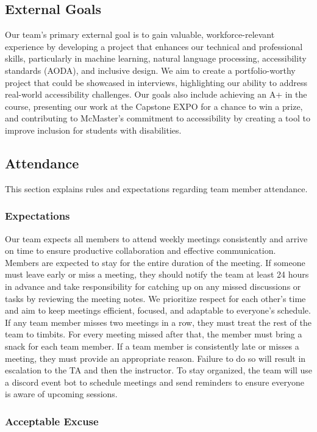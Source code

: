 \documentclass{article}
\begin{document}
\subsection*{External Goals}

Our team’s primary external goal is to gain valuable, workforce-relevant experience by 
developing a project that enhances our technical and professional skills, particularly 
in machine learning, natural language processing, accessibility standards (AODA), and inclusive design. We aim
to create a portfolio-worthy project that could be showcased in interviews, 
highlighting our ability to address real-world accessibility challenges. Our goals also 
include achieving an A+ in the course, presenting our work at the Capstone EXPO for a chance 
to win a prize, and contributing to McMaster's commitment to accessibility by creating a tool to 
improve inclusion for students with disabilities.  

\subsection*{Attendance}
This section explains rules and expectations regarding team member attendance.

\subsubsection*{Expectations}

Our team expects all members to attend weekly meetings consistently and arrive 
on time to ensure productive collaboration and effective communication. Members 
are expected to stay for the entire duration of the meeting. If someone must 
leave early or miss a meeting, they should notify the team at least 24 hours 
in advance and take responsibility for catching up on any missed discussions 
or tasks by reviewing the meeting notes. We prioritize respect for each other’s time and aim to keep meetings efficient, 
focused, and adaptable to everyone’s schedule. If any team member misses two 
meetings in a row, they must treat the rest of the team to timbits. For every 
meeting missed after that, the member must bring a snack for each team member.
If a team member is consistently late or misses a meeting, they must provide an 
appropriate reason. Failure to do so will result in escalation to the TA and 
then the instructor. To stay organized, the team will use a discord event bot to 
schedule meetings and send reminders to ensure everyone is aware of upcoming 
sessions. 
\subsubsection*{Acceptable Excuse}
\end{document}
